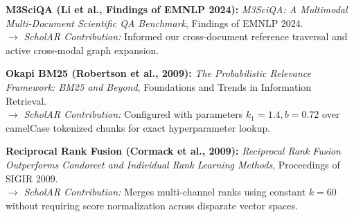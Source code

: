 \documentclass[11pt,a4paper]{article}
\begin{document}
\begin{enumerate}[leftmargin=*,label={[\arabic*]}]
    \item \textbf{M3SciQA (Li et al., Findings of EMNLP 2024):} \emph{M3SciQA: A Multimodal Multi-Document Scientific QA Benchmark}, Findings of EMNLP 2024. \\
    $\rightarrow$ \emph{ScholAR Contribution:} Informed our cross-document reference traversal and active cross-modal graph expansion.
    
    \item \textbf{Okapi BM25 (Robertson et al., 2009):} \emph{The Probabilistic Relevance Framework: BM25 and Beyond}, Foundations and Trends in Information Retrieval. \\
    $\rightarrow$ \emph{ScholAR Contribution:} Configured with parameters $k_1=1.4, b=0.72$ over camelCase tokenized chunks for exact hyperparameter lookup.
    
    \item \textbf{Reciprocal Rank Fusion (Cormack et al., 2009):} \emph{Reciprocal Rank Fusion Outperforms Condorcet and Individual Rank Learning Methods}, Proceedings of SIGIR 2009. \\
    $\rightarrow$ \emph{ScholAR Contribution:} Merges multi-channel ranks using constant $k=60$ without requiring score normalization across disparate vector spaces.
\end{enumerate}
\end{document}
